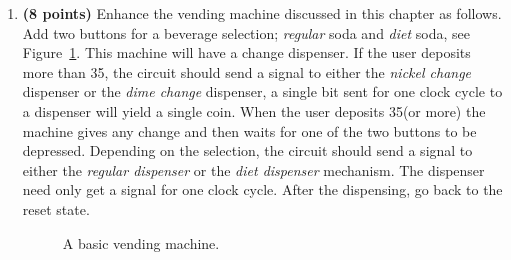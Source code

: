 \begin{enumerate}
\begin{solution}
{The cost of this solution is 6*8 + 6 + 2 + 9 + 6 + 6 + 9 + 6 + 2 + 5 = 48 + 51 = 99
}\end{solution}

\item {\bf (8 points)}
Enhance the vending machine discussed in this chapter as follows.
Add two buttons for a beverage selection; {\it regular} soda and {\it diet}
soda, see Figure~\ref{fig:Vend}.  This machine will have a change dispenser.  
If the user deposits more than 35\textcent, the circuit should send a signal to
either the {\it nickel change} dispenser or the {\it dime change} dispenser, 
a single bit sent for one clock cycle to a dispenser will yield a single coin.
When the user deposits 35\textcent (or more) the machine gives any change and 
then waits for one of the two buttons to be depressed.  Depending on the 
selection, the circuit should send a signal to either the 
{\it regular dispenser} or
the {\it diet dispenser} mechanism.  The dispenser need only get a signal for
one clock cycle.  After the dispensing, go back to the reset state.
\begin{figure}[ht]
\caption{A basic vending machine.}
\label{fig:Vend}
\end{figure}

\begin{solution}{

\begin{figure}[ht]
\end{figure}

}
\end{solution}
\end{enumerate}
